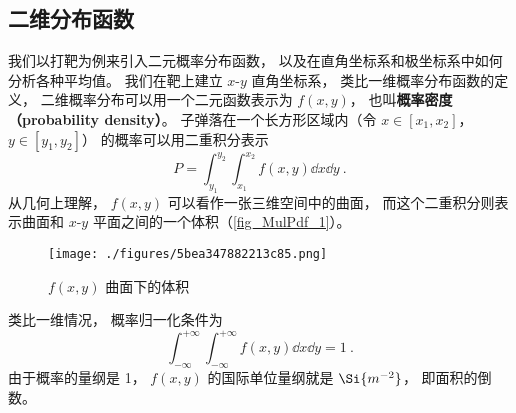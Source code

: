 


\subsection{二维分布函数}
我们以打靶为例来引入二元概率分布函数， 以及在直角坐标系和极坐标系中如何分析各种平均值。 我们在靶上建立 $x$-$y$ 直角坐标系， 类比一维概率分布函数的定义， 二维概率分布可以用一个二元函数表示为 $f(x, y)$， 也叫\textbf{概率密度（probability density）}。 子弹落在一个长方形区域内（令 $x \in [x_1, x_2]$， $y \in [y_1, y_2]$） 的概率可以用二重积分表示
\begin{equation}
P = \int_{y_1}^{y_2} \int_{x_1}^{x_2} f(x, y) \dd{x} \dd{y}~.
\end{equation}
从几何上理解， $f(x, y)$ 可以看作一张三维空间中的曲面， 而这个二重积分则表示曲面和 $x$-$y$ 平面之间的一个体积（\autoref{fig_MulPdf_1}）。

\begin{figure}[ht]
\centering
\texttt{[image: ./figures/5bea347882213c85.png]}
\caption{$f(x, y)$ 曲面下的体积} \label{fig_MulPdf_1}
\end{figure}

类比一维情况， 概率归一化条件为
\begin{equation}
\int_{-\infty}^{+\infty} \int_{-\infty}^{+\infty} f(x, y) \dd{x} \dd{y} = 1~.
\end{equation}
由于概率的量纲是 1， $f(x, y)$ 的国际单位量纲就是 $\Si{m^{-2}}$， 即面积的倒数。

